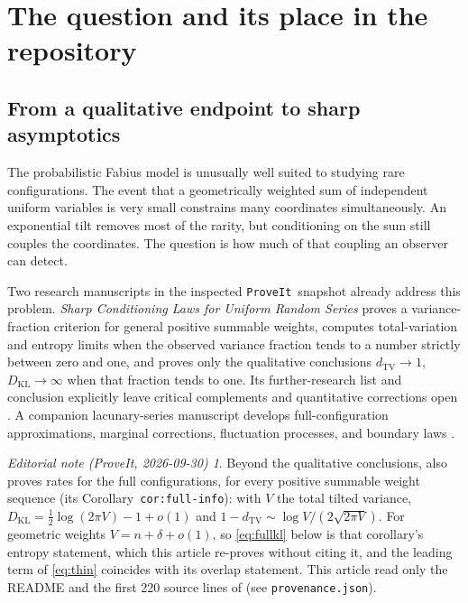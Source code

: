 \documentclass[11pt,a4paper]{article}
\numberwithin{equation}{section}
\theoremstyle{definition}
\theoremstyle{remark}
\newtheorem*{ednote}{Editorial note (ProveIt, 2026-09-30)}
\newcommand{\TV}{d_{\mathrm{TV}}}
\newcommand{\KL}{D_{\mathrm{KL}}}
\newcommand{\repo}{\texttt{ProveIt}}
\begin{document}
\section{The question and its place in the repository}
\label{sec:context}

\subsection{From a qualitative endpoint to sharp asymptotics}
The probabilistic Fabius model is unusually well suited to studying rare
configurations. The event that a geometrically weighted sum of independent
uniform variables is very small constrains many coordinates simultaneously.
An exponential tilt removes most of the rarity, but conditioning on the
sum still couples the coordinates. The question is how much of that
coupling an observer can detect.

Two research manuscripts in the inspected \repo\ snapshot already address
this problem. \emph{Sharp Conditioning Laws for Uniform Random Series}
proves a variance-fraction criterion for general positive summable
weights, computes total-variation and entropy limits when the observed
variance fraction tends to a number strictly between zero and one, and
proves only the qualitative conclusions $\TV\to1$, $\KL\to\infty$ when
that fraction tends to one. Its further-research list and conclusion
explicitly leave critical complements and quantitative corrections open
\cite{repo-uniform}. A companion lacunary-series manuscript develops
full-configuration approximations, marginal corrections, fluctuation
processes, and boundary laws \cite{repo-lacunary}.
\begin{ednote}
Beyond the qualitative conclusions, \cite{repo-uniform} also proves rates
for the full configurations, for every positive summable weight sequence
(its Corollary~\texttt{cor:full-info}): with $V$ the total tilted variance,
$\KL=\frac12\log(2\pi V)-1+o(1)$ and $1-\TV\sim\log V/(2\sqrt{2\pi V})$.
For geometric weights $V=n+\delta+o(1)$, so \eqref{eq:fullkl} below is
that corollary's entropy statement, which this article re-proves without
citing it, and the leading term of \eqref{eq:thin} coincides with its
overlap statement. This article read only the README and the first 220
source lines of \cite{repo-uniform} (see \texttt{provenance.json}).
\end{ednote}
\end{document}
